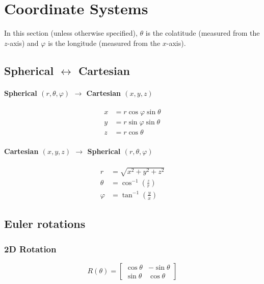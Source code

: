 \documentclass{book}
\newcommand{\phase}{\varphi}
\begin{document}
\chapter{Coordinate Systems}

In this section (unless otherwise specified), $\theta$ is the colatitude (measured from the $z$-axis) and $\phase$ is the longitude (measured from the $x$-axis).

\section{Spherical $\leftrightarrow$ Cartesian}

\subsubsection{Spherical $(r,\theta,\phase)$ $\rightarrow$ Cartesian $(x,y,z)$}
\begin{equation}
    \begin{aligned}
        x &= r \cos\phase\sin\theta \\
        y &= r \sin\phase\sin\theta \\
        z &= r \cos\theta
    \end{aligned}
\end{equation}
\subsubsection{Cartesian $(x,y,z)$ $\rightarrow$ Spherical $(r,\theta,\phase)$}
\begin{equation}
    \begin{aligned}
        r &= \sqrt{x^2+y^2+z^2} \\
        \theta &= \cos^{-1} \left(\frac{z}{r}\right) \\
        \phase &= \tan^{-1} \left(\frac{y}{x}\right)
    \end{aligned}
\end{equation}

\section{Euler rotations}

\subsection{2D Rotation}

\begin{equation}
    R(\theta) = \begin{bmatrix}
        \cos\theta & -\sin\theta \\
        \sin\theta & \cos\theta
    \end{bmatrix}
\end{equation}
\end{document}
